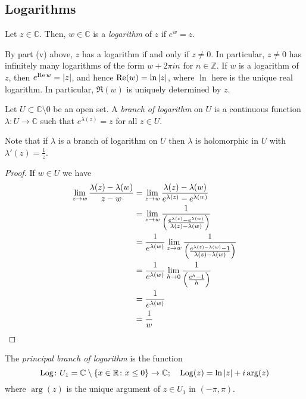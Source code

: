 \subsection{Logarithms}
\begin{definition}
	Let \( z \in \mathbb C \).
	Then, \( w \in \mathbb C \) is a \textit{logarithm} of \( z \) if \( e^w = z \).
\end{definition}
By part (v) above, \( z \) has a logarithm if and only if \( z \neq 0 \).
In particular, \( z \neq 0 \) has infinitely many logarithms of the form \( w + 2 \pi i n \) for \( n \in \mathbb Z \).
If \( w \) is a logarithm of \( z \), then \( e^{\Re w} = \abs{z} \), and hence \( \Re(w) = \ln \abs{z} \), where \( \ln \) here is the unique real logarithm.
In particular, \( \Re(w) \) is uniquely determined by \( z \).
\begin{definition}
	Let \( U \subset \mathbb C \setminus \qty{0} \) be an open set.
	A \textit{branch of logarithm} on \( U \) is a continuous function \( \lambda \colon U \to \mathbb C \) such that \( e^{\lambda(z)} = z \) for all \( z \in U \).
\end{definition}
\begin{remark}
	Note that if \( \lambda \) is a branch of logarithm on \( U \) then \( \lambda \) is holomorphic in \( U \) with \( \lambda'(z) = \frac{1}{z} \).
\end{remark}
\begin{proof}
	If \( w \in U \) we have
	\begin{align*}
		\lim_{z \to w} \frac{\lambda(z) - \lambda(w)}{z - w} &= \lim_{z \to w} \frac{\lambda(z) - \lambda(w)}{e^{\lambda(z)} - e^{\lambda(w)}} \\
		&= \lim_{z \to w} \frac{1}{\qty(\frac{e^{\lambda(z)} - e^{\lambda(w)}}{\lambda(z) - \lambda(w)})} \\
		&= \frac{1}{e^{\lambda(w)}} \lim_{z \to w} \frac{1}{\qty(\frac{e^{\lambda(z) - \lambda(w)} - 1}{\lambda(z) - \lambda(w)})} \\
		&= \frac{1}{e^{\lambda(w)}} \lim_{h \to 0} \frac{1}{\qty(\frac{e^h - 1}{h})} \\
		&= \frac{1}{e^{\lambda(w)}} \\
		&= \frac{1}{w}
	\end{align*}
\end{proof}
\begin{definition}
	The \textit{principal branch of logarithm} is the function
	\[ \operatorname{Log} \colon U_1 = \mathbb C \setminus \qty{x \in \mathbb R \colon x \leq 0} \to \mathbb C;\quad \operatorname{Log}(z) = \ln\abs{z} + i \arg(z) \]
	where \( \arg(z) \) is the unique argument of \( z \in U_1 \) in \( (-\pi, \pi) \).
\end{definition}
